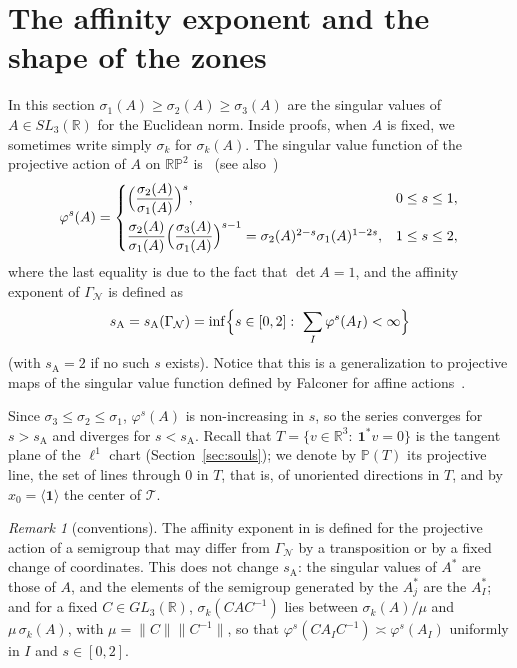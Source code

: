 \documentclass[11pt]{amsart}
\theoremstyle{definition}
\theoremstyle{remark}
\newtheorem{remark}[proposition]{Remark}
\newcommand{\one}{\mathbf 1}
\newcommand{\R}{\mathbb R}
\newcommand{\RP}{\mathbb{RP}}
\newcommand{\cT}{\mathcal T}
\newcommand{\GN}{\Gamma_{\mathcal N}}
\newcommand{\sA}{s_{\mathrm A}}
\newcommand{\norm}[1]{\lVert #1\rVert}
\newcommand{\pr}[1]{\langle #1\rangle}
\newcommand{\PT}{\mathbb P(T)}
\begin{document}
\section{The affinity exponent and the shape of the zones}\label{sec:affinity}

In this section $\sigma_1(A)\ge\sigma_2(A)\ge\sigma_3(A)$ are the singular values of $A\in SL_3(\R)$ for the Euclidean norm. 
Inside proofs, when $A$ is fixed, we sometimes write simply $\sigma_k$ for $\sigma_k(A)$. 
The singular value function of the projective action of $A$ on $\RP^2$ is~\cite[Eq. 1.2]{Jur26} (see also~\cite[Eq. 1.1]{JLPX23})
\[
  \varphi^s(A)=
  \begin{cases}
    \Bigl(\dfrac{\sigma_2(A)}{\sigma_1(A)}\Bigr)^s, & 0\le s\le1,\\[2ex]
    \dfrac{\sigma_2(A)}{\sigma_1(A)}\Bigl(\dfrac{\sigma_3(A)}{\sigma_1(A)}\Bigr)^{s-1}=\sigma_2(A)^{2-s}\sigma_1(A)^{1-2s}, & 1\le s\le2,
  \end{cases}
\]
where the last equality is due to the fact that $\det A=1$, and the affinity exponent of $\GN$ is defined as 
\[
  \sA=\sA(\GN)=\inf\Bigl\{s\in[0,2]:\ \sum_I\varphi^s(A_I)<\infty\Bigr\}
\]
(with $\sA=2$ if no such $s$ exists). 
Notice that this is a generalization to projective maps of the singular value function defined by Falconer for affine actions~\cite{Fal88}.

Since $\sigma_3\le\sigma_2\le\sigma_1$, $\varphi^s(A)$ is non-increasing in $s$, so the series converges for $s>\sA$ and diverges for $s<\sA$. 
Recall that $T=\{v\in\R^3:\ \one^*v=0\}$ is the tangent plane of the $\ell^1$ chart (Section~\ref{sec:souls}); we denote by $\PT$ its projective line, the set of lines through $0$ in $T$, that is, of unoriented directions in $T$, and by $x_0=\pr\one$ the center of $\cT$.

\begin{remark}[conventions]\label{rem:conventions}
The affinity exponent in \cite{JLPX23,Jur26} is defined for the projective action of a semigroup that may differ from $\GN$ by a transposition or by a fixed change of coordinates.
This does not change $\sA$: the singular values of $A^*$ are those of $A$, and the elements of the semigroup generated by the $A_j^*$ are the $A_I^*$; and for a fixed $C\in GL_3(\R)$, $\sigma_k(CAC^{-1})$ lies between $\sigma_k(A)/\mu$ and $\mu\,\sigma_k(A)$, with $\mu=\norm C\norm{C^{-1}}$, so that $\varphi^s(CA_IC^{-1})\asymp\varphi^s(A_I)$ uniformly in $I$ and $s\in[0,2]$.
\end{remark}
\end{document}

